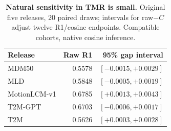 \begin{table}[t]
\centering\footnotesize
\caption{\textbf{Natural sensitivity in TMR is small.} Original five releases, 20 paired draws; intervals for raw$-C$ adjust twelve R1/cosine endpoints. Compatible cohorts, native cosine inference.}\label{tab:tmrnaturalcompact}
\begin{tabular}{@{}lrr@{}}\toprule
Release&Raw R1&95\% gap interval\\\midrule
MDM50&0.5578&$[-0.0015,+0.0029]$\\
MLD&0.5848&$[-0.0005,+0.0019]$\\
MotionLCM-v1&0.6785&$[+0.0013,+0.0043]$\\
T2M-GPT&0.6703&$[-0.0006,+0.0017]$\\
T2M&0.5626&$[+0.0003,+0.0028]$\\
\bottomrule\end{tabular}\end{table}

